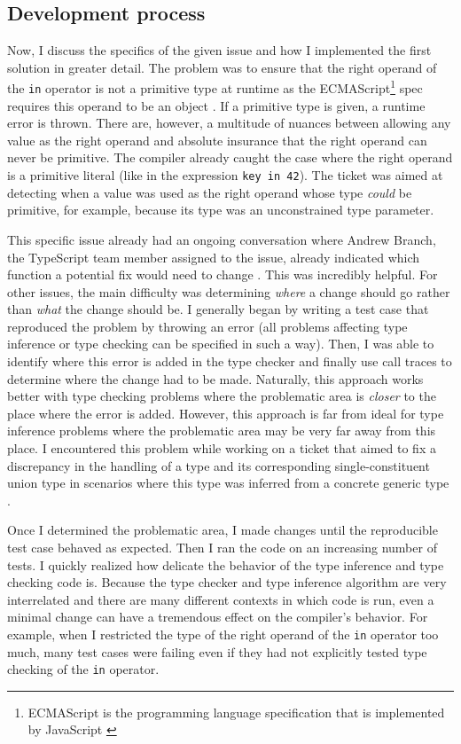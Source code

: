 \documentclass[12pt]{scrartcl}
\def\code#1{\texttt{\frenchspacing#1}}
\begin{document}
\subsection{Development process}
\label{development_process}

Now, I discuss the specifics of the given issue and how I implemented the first solution in greater detail. The problem was to ensure that the right operand of the \code{in} operator is not a primitive type at runtime as the ECMAScript\footnote{ECMAScript is the programming language specification that is implemented by JavaScript \cite{ECMAScript}} spec requires this operand to be an object \cite{InOperator}. If a primitive type is given, a runtime error is thrown. There are, however, a multitude of nuances between allowing any value as the right operand and absolute insurance that the right operand can never be primitive. The compiler already caught the case where the right operand is a primitive literal (like in the expression \code{key in 42}). The ticket was aimed at detecting when a value was used as the right operand whose type \textit{could} be primitive, for example, because its type was an unconstrained type parameter.

This specific issue already had an ongoing conversation where Andrew Branch, the TypeScript team member assigned to the issue, already indicated which function a potential fix would need to change \cite{41317Comment}. This was incredibly helpful. For other issues, the main difficulty was determining \textit{where} a change should go rather than \textit{what} the change should be. I generally began by writing a test case that reproduced the problem by throwing an error (all problems affecting type inference or type checking can be specified in such a way). Then, I was able to identify where this error is added in the type checker and finally use call traces to determine where the change had to be made. Naturally, this approach works better with type checking problems where the problematic area is \textit{closer} to the place where the error is added. However, this approach is far from ideal for type inference problems where the problematic area may be very far away from this place. I encountered this problem while working on a ticket that aimed to fix a discrepancy in the handling of a type and its corresponding single-constituent union type in scenarios where this type was inferred from a concrete generic type \cite{42516Comment}.

Once I determined the problematic area, I made changes until the reproducible test case behaved as expected. Then I ran the code on an increasing number of tests. I quickly realized how delicate the behavior of the type inference and type checking code is. Because the type checker and type inference algorithm are very interrelated and there are many different contexts in which code is run, even a minimal change can have a tremendous effect on the compiler's behavior. For example, when I restricted the type of the right operand of the \code{in} operator too much, many test cases were failing even if they had not explicitly tested type checking of the \code{in} operator.
\end{document}
